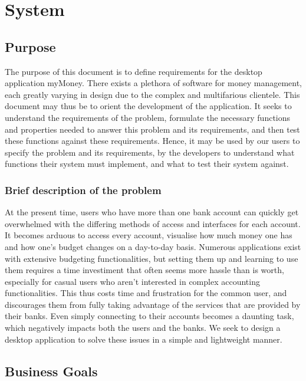 \tableofcontents
\listoffigures
\listoftables

\clearpage

\section{System}\subsection{Purpose}

The purpose of this document is to define requirements for the  desktop application myMoney.
There exists a plethora of software for money management, each greatly varying in design due to the complex and multifarious clientele. This document may thus be to orient the development of the application. It seeks to understand the requirements of the problem, formulate the necessary functions and properties needed to answer this problem and its requirements, and then test these functions against these requirements. Hence, it may be used by our users to specify the problem and its requirements, by the developers to understand what functions their system must implement, and what to test their system against.

\subsubsection{Brief description of the problem}
At the present time, users who have more than one bank account can quickly get overwhelmed with the differing methods of access and interfaces for each account. It becomes arduous to access every account, visualise how much money one has and how one's budget changes on a day-to-day basis. Numerous applications exist with extensive budgeting functionalities, but setting them up and learning to use them requires a time investiment that often seems more hassle than is worth, especially for casual users who aren't interested in complex accounting functionalities. This thus costs time and frustration for the common user, and discourages them from fully taking advantage of the services that are provided by their banks. Even simply connecting to their accounts becomes a daunting task, which negatively impacts both the users and the banks. We seek to design a desktop application to solve these issues in a simple and lightweight manner.

\subsection{Business Goals}

